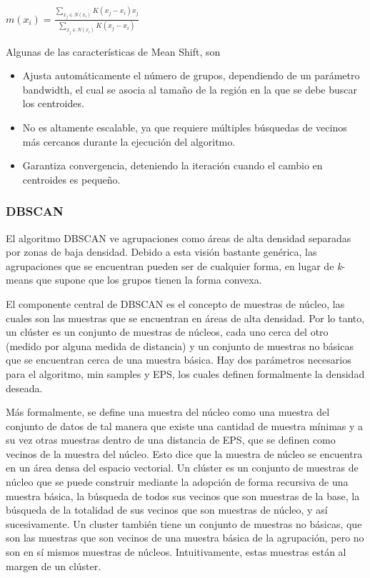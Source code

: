 \begin{center}
	
	
	$m(x_i) = \frac{\sum_{x_j \in N(x_i)}K(x_j - x_i)x_j}{\sum_{x_j \in N(x_i)}K(x_j - x_i)}$
	
\end{center}

Algunas de las características de Mean Shift, son

\begin{itemize}
	
	\item Ajusta automáticamente el número de grupos, dependiendo de un parámetro bandwidth, el cual se asocia al tamaño de la región en la que se debe buscar los centroides. 
	
	\item No es altamente escalable, ya que requiere múltiples búsquedas de vecinos más cercanos durante la ejecución del algoritmo. 
	
	\item Garantiza convergencia, deteniendo la iteración cuando el cambio en centroides es pequeño.
		
\end{itemize}

\subsubsection{DBSCAN}

El algoritmo DBSCAN ve agrupaciones como áreas de alta densidad separadas por zonas de baja densidad. Debido a esta visión bastante genérica, las agrupaciones que se encuentran pueden ser de cualquier forma, en lugar de \textit{k}-means  que supone que los grupos tienen la forma convexa.

El componente central de DBSCAN es el concepto de muestras de núcleo, las cuales son las muestras que se encuentran en áreas de alta densidad. Por lo tanto, un clúster es un conjunto de muestras de núcleos, cada uno cerca del otro (medido por alguna medida de distancia) y un conjunto de muestras no básicas que se encuentran cerca de una muestra básica. Hay dos parámetros necesarios para el algoritmo, min samples y EPS, los cuales definen formalmente la densidad deseada.


Más formalmente, se define una muestra del núcleo como una muestra del conjunto de datos de tal manera que existe una cantidad de muestra mínimas y a su vez otras muestras dentro de una distancia de EPS, que se definen como vecinos de la muestra del núcleo. Esto dice que la muestra de núcleo se encuentra en un área densa del espacio vectorial. Un clúster es un conjunto de muestras de núcleo que se puede construir mediante la adopción de forma recursiva de una muestra básica, la búsqueda de todos sus vecinos que son muestras de la base, la búsqueda de la totalidad de sus vecinos que son muestras de núcleo, y así sucesivamente. Un cluster también tiene un conjunto de muestras no básicas, que son las muestras que son vecinos de una muestra básica de la agrupación, pero no son en sí mismos muestras de núcleos. Intuitivamente, estas muestras están al margen de un clúster.


